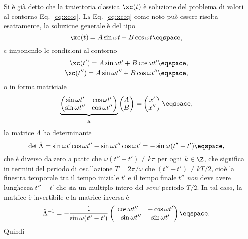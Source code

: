 Si \`e gi\`a detto che la traiettoria classica $\xc(t)$ \`e soluzione del
problema di valori al contorno  Eq.~\eqref{eq:xceq}.
La Eq.~\eqref{eq:xceq} come noto pu\`o essere risolta esattamente, la soluzione
generale \`e del tipo
\begin{displaymath}
\xc(t) = A \sin \omega t + B \cos \omega t \eqspace, 
\end{displaymath}
e imponendo le condizioni al contorno
\begin{eqnarray*}
\xc(t')  =  A \sin \omega t' + B \cos \omega t' \eqspace,  \\
\xc(t'')  =  A \sin \omega t'' + B \cos \omega t''  \eqspace,
\end{eqnarray*}
o in forma matriciale
\begin{displaymath}
\underbrace{%
\begin{pmatrix} 
\sin \omega t' & \cos \omega t' \\
\sin \omega t'' & \cos \omega t'' 
\end{pmatrix} }_{\hat{\Lambda}}
\begin{pmatrix}
A \\ B\end{pmatrix} = \begin{pmatrix} x' \\ x'' \end{pmatrix} \eqspace, 
\end{displaymath}
la matrice $\hat{\Lambda}$ ha determinante
\begin{displaymath}
\det\hat{\Lambda} = \sin \omega t' \cos \omega t'' - \sin \omega t''
\cos \omega t' = -\sin \omega (t'' - t') \eqspace, 
\end{displaymath}
che \`e diverso da zero a patto che 
$\omega (t'' -t') \neq k \pi $ per ogni  $k\in\Z$, che significa in termini del
periodo di oscillazione 
$T  = 2\pi / \omega $ che 
$(t'' - t') \neq  k T / 2 $, cio\`e la finestra temporale tra il tempo iniziale
$t'$ e il tempo finale $t''$ \emph{non} deve avere lunghezza $t''-t'$ che sia un
multiplo intero del \emph{semi}-periodo $T/2$.
In tal caso, la matrice \`e invertibile e  la matrice inversa \`e
\begin{displaymath}
\hat{\Lambda}^{-1} = -
\frac{1}{\sin \omega (t''-t') }  
\begin{pmatrix} \cos \omega t'' & - \cos \omega
t' \\ -\sin \omega t'' & \sin \omega t' \end{pmatrix}  \eqspace .
\end{displaymath}
Quindi
